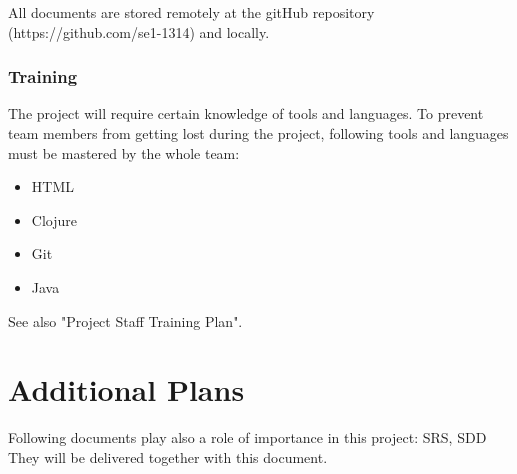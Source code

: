 \documentclass[12pt]{article}
\begin{document}
All documents are stored remotely at the gitHub repository
(https://github.com/se1-1314) and locally.

\subsubsection{Training}\label{training}

The project will require certain knowledge of tools and languages. To
prevent team members from getting lost during the project, following
tools and languages must be mastered by the whole team:

\begin{itemize}
\itemsep1pt\parskip0pt
\item
  HTML
\item
  Clojure
\item
  Git
\item
  Java 
\end{itemize}

See also "Project Staff Training Plan".

\section{Additional Plans}\label{additional-plans}

Following documents play also a role of importance in this project: SRS,
SDD They will be delivered together with this document.
\end{document}
